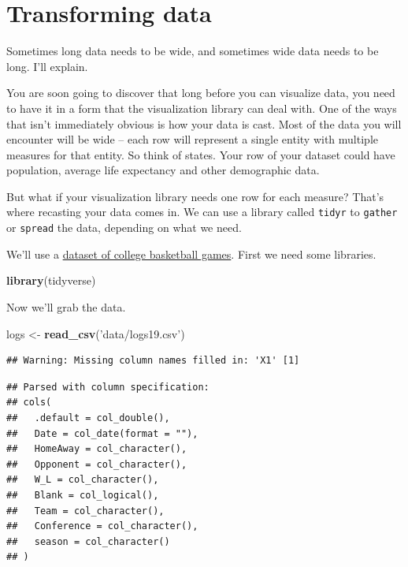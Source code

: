 \documentclass[]{book}
\newenvironment{Shaded}{\begin{snugshade}}{\end{snugshade}}
\newcommand{\KeywordTok}[1]{\textcolor[rgb]{0.13,0.29,0.53}{\textbf{#1}}}
\newcommand{\StringTok}[1]{\textcolor[rgb]{0.31,0.60,0.02}{#1}}
\newcommand{\NormalTok}[1]{#1}
\begin{document}
\chapter{Transforming data}\label{transforming-data}

Sometimes long data needs to be wide, and sometimes wide data needs to
be long. I'll explain.

You are soon going to discover that long before you can visualize data,
you need to have it in a form that the visualization library can deal
with. One of the ways that isn't immediately obvious is how your data is
cast. Most of the data you will encounter will be wide -- each row will
represent a single entity with multiple measures for that entity. So
think of states. Your row of your dataset could have population, average
life expectancy and other demographic data.

But what if your visualization library needs one row for each measure?
That's where recasting your data comes in. We can use a library called
\texttt{tidyr} to \texttt{gather} or \texttt{spread} the data, depending
on what we need.

We'll use a
\href{https://unl.box.com/s/a8m91bro10t89watsyo13yjegb1fy009}{dataset of
college basketball games}. First we need some libraries.

\begin{Shaded}
\begin{Highlighting}[]
\KeywordTok{library}\NormalTok{(tidyverse)}
\end{Highlighting}
\end{Shaded}

Now we'll grab the data.

\begin{Shaded}
\begin{Highlighting}[]
\NormalTok{logs <-}\StringTok{ }\KeywordTok{read_csv}\NormalTok{(}\StringTok{'data/logs19.csv'}\NormalTok{)}
\end{Highlighting}
\end{Shaded}

\begin{verbatim}
## Warning: Missing column names filled in: 'X1' [1]
\end{verbatim}

\begin{verbatim}
## Parsed with column specification:
## cols(
##   .default = col_double(),
##   Date = col_date(format = ""),
##   HomeAway = col_character(),
##   Opponent = col_character(),
##   W_L = col_character(),
##   Blank = col_logical(),
##   Team = col_character(),
##   Conference = col_character(),
##   season = col_character()
## )
\end{verbatim}
\end{document}
